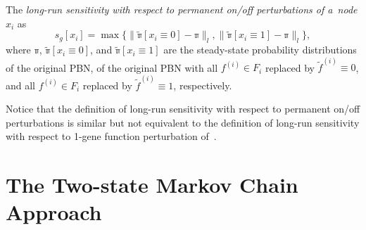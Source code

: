 \documentclass[runningheads,a4paper]{llncs}
\begin{document}
\begin{definition}
\label{def:LRS_node}
The \emph{long-run sensitivity with respect to permanent on/off perturbations of a~node $x_i$} as
\begin{equation*}
s_g[x_i] = \max \{\|\mathbb{\tilde{\pi}}[x_i \equiv 0] - \mathbb{\pi} \|_l,
 \| \mathbb{\tilde{\pi}}[x_i \equiv 1] - \mathbb{\pi} \|_l\},
\end{equation*}
where $\mathbb{\pi}$, $\mathbb{\tilde{\pi}}[x_i \equiv 0]$, and $\mathbb{\tilde{\pi}}[x_i \equiv
1]$ are the steady-state probability distributions of the original PBN, of the original PBN with
all $f^{(i)} \in F_{i}$ replaced by $\tilde{f}^{(i)} \equiv 0$, and all $f^{(i)} \in F_{i}$
replaced by $\tilde{f}^{(i)} \equiv 1$, respectively.
\end{definition}

Notice that the definition of long-run sensitivity with respect to permanent on/off perturbations
is similar but not equivalent to the definition of long-run sensitivity with respect to 1-gene
function perturbation of~\cite{SDKZ02}.


\section{The Two-state Markov Chain Approach}
\label{sec:twostate}
\end{document}
